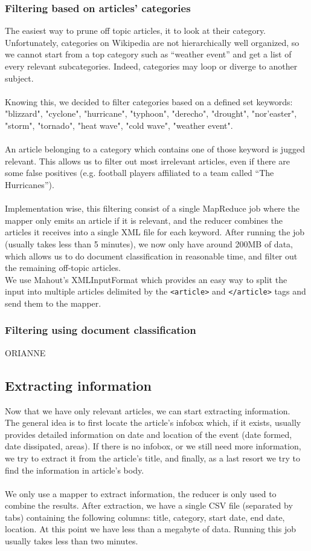 \subsubsection{Filtering based on articles' categories}
The easiest way to prune off topic articles, it to look at their category. Unfortunately, categories on Wikipedia are not hierarchically well organized, so we cannot start from a top category such as ``weather event'' and get a list of every relevant subcategories. Indeed, categories may loop or diverge to another subject.\\\\
Knowing this, we decided to filter categories based on a defined set keywords: "blizzard", "cyclone", "hurricane", "typhoon", "derecho", "drought", "nor'easter", "storm", "tornado", "heat wave", "cold wave", "weather event". \\\\
An article belonging to a category which contains one of those keyword is jugged relevant. This allows us to filter out most irrelevant articles, even if there are some false positives (e.g. football players affiliated to a team called ``The Hurricanes'').\\\\
Implementation wise, this filtering consist of a single MapReduce job where the mapper only emits an article if it is relevant, and the reducer combines the articles it receives into a single XML file for each keyword. 
After running the job (usually takes less than 5 minutes), we now only have around 200MB of data, which allows us to do document classification in reasonable time, and filter out the remaining off-topic articles.\\ 
We use Mahout's XMLInputFormat which provides an easy way to split the input into multiple articles delimited by the \texttt{<article>} and \texttt{</article>} tags and send them to the mapper.
\subsubsection{Filtering using document classification}
ORIANNE
\subsection{Extracting information}
Now that we have only relevant articles, we can start extracting information. \\
The general idea is to first locate the article's infobox which, if it exists, usually provides detailed information on date and location of the event (date formed, date dissipated, areas). If there is no infobox, or we still need more information, we try to extract it from the article's title, and finally, as a last resort we try to find the information in article's body.\\\\
We only use a mapper to extract information, the reducer is only used to combine the results.
After extraction, we have a single CSV file (separated by tabs) containing the following columns: title, category, start date, end date, location. At this point we have less than a megabyte of data. Running this job usually takes less than two minutes.
